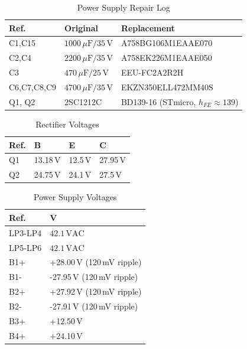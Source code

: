 \documentclass[]{article}
\begin{document}
\begin{table}[H]
	\centering
	\caption{Power Supply Repair Log}
	\label{tab:power_supply_log}
	\begin{tabular}{|l|l|l|}
		\hline
		\textbf{Ref.} & \textbf{Original} & \textbf{Replacement} \\
        \hline
        C1,C15 & $1000\,\mu\mathrm{F} / 35\,\mathrm{V}$ & A758BG106M1EAAE070 \\
        \hline
        C2,C4 & $2200\,\mu\mathrm{F} / 35\,\mathrm{V}$ & A758EK226M1EAAE050 \\
        \hline
        C3 & $470\,\mu\mathrm{F} / 25\,\mathrm{V}$ & EEU-FC2A2R2H \\
        \hline
        C6,C7,C8,C9 & $4700\,\mu\mathrm{F} / 35\,\mathrm{V}$ & EKZN350ELL472MM40S \\
        \hline
        Q1, Q2 & 2SC1212C & BD139-16 (STmicro, $h_{FE} \approx 139$) \\
        \hline
	\end{tabular}
\end{table}

\begin{table}[H]
	\centering
	\caption{Rectifier Voltages}
	\label{tab:rectifier_voltages}
	\begin{tabular}{|l|l|l|l|}
		\hline
		\textbf{Ref.} & \textbf{B} & \textbf{E} & \textbf{C} \\
    \hline
    Q1 & 13.18\,V & 12.5\,V & 27.95\,V \\
    \hline
    Q2 & 24.75\,V & 24.1\,V & 27.5\,V \\
    \hline
	\end{tabular}
\end{table}

\begin{table}[H]
	\centering
	\caption{Power Supply Voltages}
	\label{tab:power_supply_volt}
	\begin{tabular}{|l|l|}
		\hline
		\textbf{Ref.} & \textbf{V} \\
        \hline
        LP3-LP4 & $42.1\,\mathrm{VAC}$ \\
        \hline
        LP5-LP6 & $42.1\,\mathrm{VAC}$ \\
        \hline
        B1+ & +28.00\,V (120\,mV ripple) \\
        \hline
        B1- & -27.95\,V (120\,mV ripple) \\
        \hline
        B2+ & +27.92\,V (120\,mV ripple) \\
        \hline
        B2- & -27.91\,V (120\,mV ripple) \\
        \hline
        B3+ & +12.50\,V \\
        \hline
        B4+ & +24.10\,V \\
        \hline
	\end{tabular}
\end{table}
\end{document}
